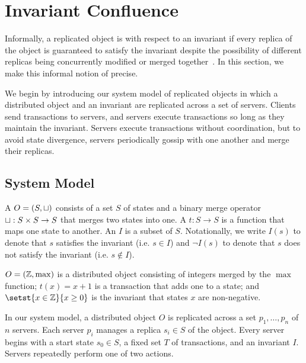 \section{Invariant Confluence}
Informally, a replicated object is  with respect
to an invariant if every replica of the object is guaranteed to satisfy the
invariant despite the possibility of different replicas being concurrently
modified or merged together~\cite{bailis2014coordination}. In this section, we
make this informal notion of \invariantconfluence{} precise.

We begin by introducing our system model of replicated objects in which a
distributed object and an invariant are replicated across a set of
servers. Clients send transactions to servers, and servers execute
transactions so long as they maintain the invariant. Servers execute
transactions without coordination, but to avoid state divergence, servers
periodically gossip with one another and merge their replicas.
%

\subsection{System Model}

A  $O = (S, \sqcup)$ consists of a set $S$ of states
and a binary merge operator $\sqcup: S \times S \to S$ that merges two states
into one. A  $t: S \to S$ is a function that maps one
state to another. An  $I$ is a subset of $S$. Notationally,
we write $I(s)$ to denote that $s$ satisfies the invariant (i.e. $s \in I$)
and $\lnot I(s)$ to denote that $s$ does not satisfy the invariant (i.e. $s
\notin I$).

\vfill\null

\begin{example}
  $O = (\mathbb{Z}, \max)$ is a distributed object consisting of integers merged by the
  $\max$ function; $t(x) = x + 1$ is a transaction that adds one to a state; and
  $\setst{x \in \ints}{x \geq 0}$ is the invariant that states $x$ are
  non-negative.
\end{example}

In our system model, a distributed object $O$ is replicated across a set $p_1,
\ldots, p_n$ of $n$ servers. Each server $p_i$ manages a replica $s_i \in S$ of
the object. Every server begins with a start state $s_0 \in S$, a
fixed set $T$ of transactions, and an invariant $I$. Servers repeatedly perform
one of two actions.

